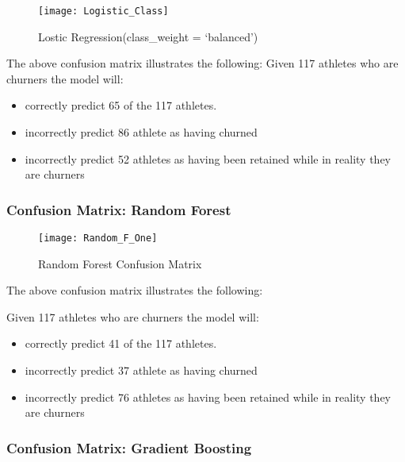 \documentclass[
10pt, %
a4paper, %
oneside, %
headinclude,footinclude, %
BCOR5mm, %
]{scrartcl}
\begin{document}
\begin{figure}[H]
\centering 
\texttt{[image: Logistic\_Class]} 
\caption[Lostic Regression Confusion Matrix]{Lostic Regression(class\_weight = `balanced') } %
\label{fig:gallery} 
\end{figure}

The above confusion matrix illustrates the following: 
Given 117 athletes who are churners the model will:

\begin{itemize}
\item correctly predict 65 of the 117 athletes. 
\item incorrectly predict 86 athlete as having churned 
\item incorrectly predict 52 athletes as having been retained while in reality they are churners
\end{itemize}
\subsubsection{\textbf{Confusion Matrix}: Random Forest}


\begin{figure}[H]
\centering 
\texttt{[image: Random\_F\_One]} 
\caption[Lostic Regression Confusion Matrix]{Random Forest Confusion Matrix} %
\label{fig:gallery} 
\end{figure}
The above confusion matrix illustrates the following: 

Given 117 athletes who are churners the model will:

\begin{itemize}
\item correctly predict 41 of the 117 athletes. 
\item incorrectly predict 37 athlete as having churned 
\item incorrectly predict 76 athletes as having been retained while in reality they are churners
\end{itemize}

\subsubsection{\textbf{Confusion Matrix}: Gradient Boosting}
\end{document}
